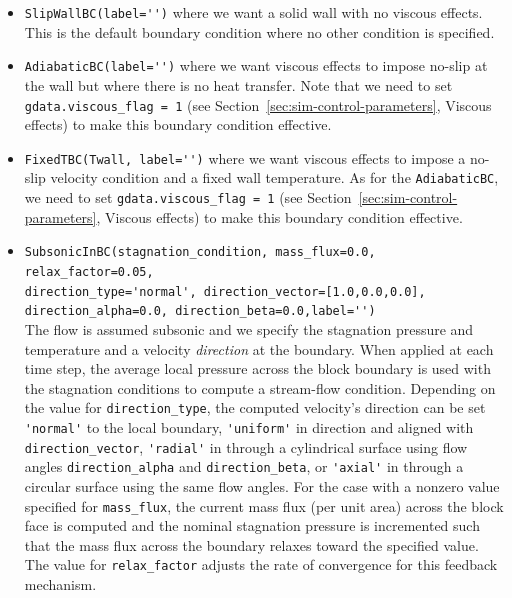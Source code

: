 \begin{itemize}
    \item \verb!SlipWallBC(label='')! where we want a solid wall with no viscous effects.
      This is the default boundary condition where no other condition is specified.
    \item \verb!AdiabaticBC(label='')! where we want viscous effects to impose no-slip at the wall
      but where there is no heat transfer. 
      Note that we need to set \verb!gdata.viscous_flag = 1! (see Section~\ref{sec:sim-control-parameters}, Viscous effects) 
      to make this boundary condition effective.
    \item \verb!FixedTBC(Twall, label='')! where we want viscous effects to impose a no-slip velocity 
      condition and a fixed wall temperature.
      As for the \verb!AdiabaticBC!, we need to set \verb!gdata.viscous_flag = 1! (see Section~\ref{sec:sim-control-parameters}, Viscous effects) 
      to make this boundary condition effective.
    \item \verb!SubsonicInBC(stagnation_condition, mass_flux=0.0, relax_factor=0.05, !\\
      \verb!direction_type='normal', direction_vector=[1.0,0.0,0.0],!\\
      \verb!direction_alpha=0.0, direction_beta=0.0,label='')! \\
      The flow is assumed subsonic and we specify the stagnation pressure and temperature and 
      a velocity \emph{direction} at the boundary. 
      When applied at each time step, the average local pressure across the block boundary
      is used with the stagnation conditions to compute a stream-flow condition.
      Depending on the value for \verb!direction_type!, the computed velocity's direction can be set 
      \verb!'normal'! to the local boundary, 
      \verb!'uniform'! in direction and aligned with \verb!direction_vector!, 
      \verb!'radial'! in through a cylindrical surface using flow angles \verb!direction_alpha! and \verb!direction_beta!,
      or \verb!'axial'! in through a circular surface using the same flow angles.
      For the case with a nonzero value specified for \verb!mass_flux!, the current mass flux (per unit area)
      across the block face is computed and the nominal stagnation pressure is incremented 
      such that the mass flux across the boundary relaxes toward the specified value.
      The value for \verb!relax_factor! adjusts the rate of convergence for this feedback mechanism.

\end{itemize}
